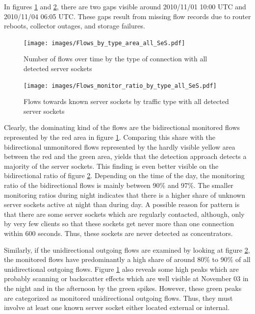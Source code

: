 In figures \ref{fig:flows_by_type} and \ref{fig:monitored_flows_by_type}, there are two gaps visible around 2010/11/01 10:00 UTC and 2010/11/04 06:05 UTC. 
These gaps result from missing flow records due to router reboots, collector outages, and storage failures\citep{Schatzmann:Mining}.
\begin{figure}
	[ht] \centering 
	\texttt{[image: images/Flows\_by\_type\_area\_all\_SeS.pdf]} \caption{Number of flows over time by the type of connection with all detected server sockets} 
	\label{fig:flows_by_type} 
\end{figure}
\begin{figure}
	[h] \centering 
	\texttt{[image: images/Flows\_monitor\_ratio\_by\_type\_all\_SeS.pdf]} \caption{Flows towards known server sockets by traffic type with all detected server sockets} 
	\label{fig:monitored_flows_by_type} 
\end{figure}

Clearly, the dominating kind of the flows are the bidirectional monitored flows represented by the red area in figure \ref{fig:flows_by_type}. 
Comparing this share with the bidirectional unmonitored flows represented by the hardly visible yellow area between the red and the green area, yields that the detection approach detects a majority of the \glspl{server socket}. 
This finding is even better visible on the bidirectional ratio of figure \ref{fig:monitored_flows_by_type}. 
Depending on the time of the day, the monitoring ratio of the bidirectional flows is mainly between 90\% and 97\%. 
The smaller monitoring ratios during night indicates that there is a higher share of unknown \glspl{server socket} active at night than during day. 
A possible reason for pattern is that there are some \glspl{server socket} which are regularly contacted, although, only by very few clients so that these sockets get never more than one connection within 600 seconds. 
Thus, these sockets are never detected as concentrators.

Similarly, if the unidirectional outgoing flows are examined by looking at figure \ref{fig:monitored_flows_by_type}, the monitored flows have predominantly a high share of around 80\% to 90\% of all unidirectional outgoing flows. 
Figure \ref{fig:flows_by_type} also reveals some high peaks which are probably scanning or backscatter effects which are well visible at November 03 in the night and in the afternoon by the green spikes. 
However, these green peaks are categorized as monitored unidirectional outgoing flows. 
Thus, they must involve at least one known \gls{server socket} either located external or internal.

